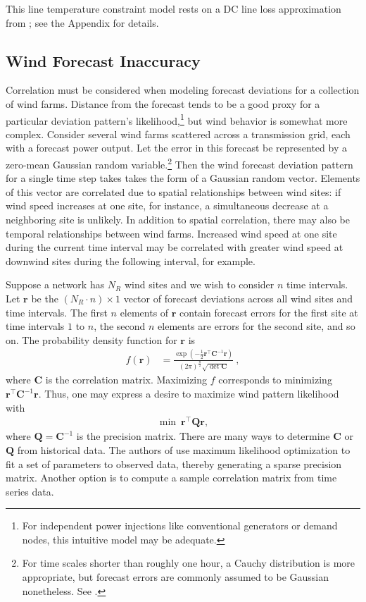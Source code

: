 \documentclass[journal,twoside]{IEEEtran}
\renewcommand{\vec}[1]{\mathbf{#1}}
\begin{document}
This line temperature constraint model rests on a DC line loss approximation from \cite{almassalkhi2014}; see the Appendix for details.

\subsection{Wind Forecast Inaccuracy}\label{sec:models-wind}
Correlation must be considered when modeling forecast deviations for a collection of wind farms. Distance from the forecast tends to be a good proxy for a particular deviation pattern's likelihood,\footnote{For independent power injections like conventional generators or demand nodes, this intuitive model may be adequate.} but wind behavior is somewhat more complex. Consider several wind farms scattered across a transmission grid, each with a forecast power output. Let the error in this forecast be represented by a zero-mean Gaussian random variable.\footnote{For time scales shorter than roughly one hour, a Cauchy distribution is more appropriate, but forecast errors are commonly assumed to be Gaussian nonetheless. See \cite{hodge2011}.} Then the wind forecast deviation pattern for a single time step takes takes the form of a Gaussian random vector. Elements of this vector are correlated due to spatial relationships between wind sites: if wind speed increases at one site, for instance, a simultaneous decrease at a neighboring site is unlikely. In addition to spatial correlation, there may also be temporal relationships between wind farms. Increased wind speed at one site during the current time interval may be correlated with greater wind speed at downwind sites during the following interval, for example.

Suppose a network has $N_R$ wind sites and we wish to consider $n$ time intervals. Let $\vec{r}$ be the $(N_R\cdot n)\times 1$ vector of forecast deviations across all wind sites and time intervals. The first $n$ elements of $\vec{r}$ contain forecast errors for the first site at time intervals $1$ to $n$, the second $n$ elements are errors for the second site, and so on. The probability density function for $\vec{r}$ is
\begin{align}
f(\vec{r}) &= \frac{\exp \left(-\frac{1}{2} \vec{r}^\top \mathbf{C}^{-1} \vec{r} \right)}{(2\pi)^{\frac{n}{2}}\sqrt{\det \mathbf{C}}}~,
\end{align}
where $\mathbf{C}$ is the correlation matrix. Maximizing $f$ corresponds to minimizing $\vec{r}^\top \mathbf{C}^{-1} \vec{r}$. Thus, one may express a desire to maximize wind pattern likelihood with
\begin{align}
\label{eq:obj}\min~ \vec{r}^\top \mathbf{Q} \vec{r},
\end{align}
where $\mathbf{Q}=\mathbf{C}^{-1}$ is the precision matrix. There are many ways to determine $\mathbf{C}$ or $\mathbf{Q}$ from historical data. The authors of \cite{tastu2015} use maximum likelihood optimization to fit a set of parameters to observed data, thereby generating a sparse precision matrix. Another option is to compute a sample correlation matrix from time series data.
\end{document}
